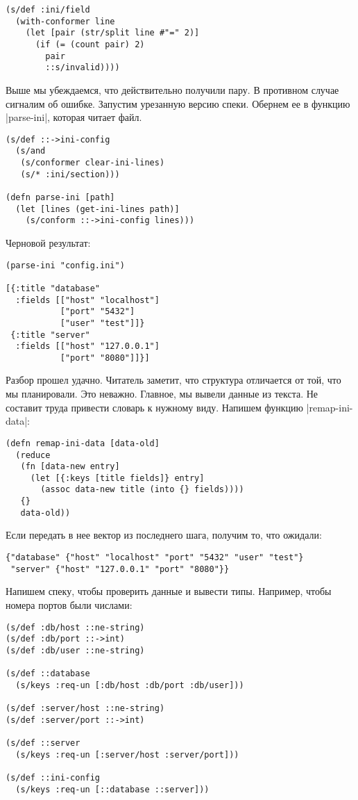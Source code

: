 \begin{verbatim}
(s/def :ini/field
  (with-conformer line
    (let [pair (str/split line #"=" 2)]
      (if (= (count pair) 2)
        pair
        ::s/invalid))))
\end{verbatim}

Выше мы убеждаемся, что действительно получили пару. В противном случае сигналим
об ошибке. Запустим урезанную версию спеки. Обернем ее в функцию
\spverb|parse-ini|, которая читает файл.

\begin{verbatim}
(s/def ::->ini-config
  (s/and
   (s/conformer clear-ini-lines)
   (s/* :ini/section)))

(defn parse-ini [path]
  (let [lines (get-ini-lines path)]
    (s/conform ::->ini-config lines)))
\end{verbatim}

\noindent
Черновой результат:

\begin{verbatim}
(parse-ini "config.ini")

[{:title "database"
  :fields [["host" "localhost"]
           ["port" "5432"]
           ["user" "test"]]}
 {:title "server"
  :fields [["host" "127.0.0.1"]
           ["port" "8080"]]}]
\end{verbatim}

Разбор прошел удачно. Читатель заметит, что структура отличается от той, что мы
планировали. Это неважно. Главное, мы вывели данные из текста. Не составит труда
привести словарь к нужному виду. Напишем функцию \spverb|remap-ini-data|:

\begin{verbatim}
(defn remap-ini-data [data-old]
  (reduce
   (fn [data-new entry]
     (let [{:keys [title fields]} entry]
       (assoc data-new title (into {} fields))))
   {}
   data-old))
\end{verbatim}

\noindent
Если передать в нее вектор из последнего шага, получим то, что ожидали:

\begin{verbatim}
{"database" {"host" "localhost" "port" "5432" "user" "test"}
 "server" {"host" "127.0.0.1" "port" "8080"}}
\end{verbatim}

Напишем спеку, чтобы проверить данные и вывести типы. Например, чтобы номера
портов были числами:

\begin{verbatim}
(s/def :db/host ::ne-string)
(s/def :db/port ::->int)
(s/def :db/user ::ne-string)

(s/def ::database
  (s/keys :req-un [:db/host :db/port :db/user]))

(s/def :server/host ::ne-string)
(s/def :server/port ::->int)

(s/def ::server
  (s/keys :req-un [:server/host :server/port]))

(s/def ::ini-config
  (s/keys :req-un [::database ::server]))
\end{verbatim}

